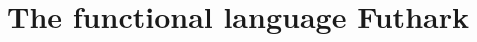 \documentclass[11pt]{article}
\begin{document}







 





\newpage

\section{The functional language Futhark}
\end{document}

